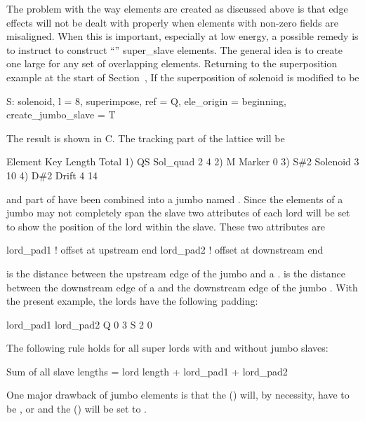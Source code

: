 The problem with the way  elements are created as
discussed above is that edge effects will not be dealt with properly
when elements with non-zero fields are misaligned. When this is
important, especially at low energy, a possible remedy is to instruct
\bmad to construct ``'' super_slave elements. The general
idea is to create one large  for any set of
overlapping elements. Returning to the superposition example at the
start of Section~, If the superposition of solenoid 
is modified to be
\begin{example}
  S: solenoid, l = 8, superimpose, ref = Q, ele_origin = beginning, 
               create_jumbo_slave = T
\end{example}
The result is shown in C. The tracking part of the lattice
will be
\begin{example}
        Element   Key         Length  Total     
  1)    Q{\B}S       Sol_quad     2        4
  2)    M         Marker       0      
  3)    S{\#}2       Solenoid     3       10
  4)    D{\#}2       Drift        4       14
\end{example}
 and part of  have been combined into a jumbo
 named . Since the  elements
of a jumbo  may not completely span the slave two
attributes of each lord will be set to show the position of the lord
within the slave. These two attributes are
\begin{example}
  lord_pad1    ! offset at upstream end
  lord_pad2    ! offset at downstream end
\end{example}
 is the distance between the upstream edge of the jumbo
 and a .  is the distance 
between the downstream edge of a  and the downstream edge
of the jumbo . With the present example, the lords have
the following padding:
\begin{example}
          lord_pad1    lord_pad2
  Q            0            3
  S            2            0
\end{example}
The following rule holds for all super lords with and without jumbo slaves:
\begin{example}
  Sum of all slave lengths = lord length + lord_pad1 + lord_pad2
\end{example}

One major drawback of jumbo  elements is that the 
() will, by necessity, have to be , or 
and the  () will be set to .

